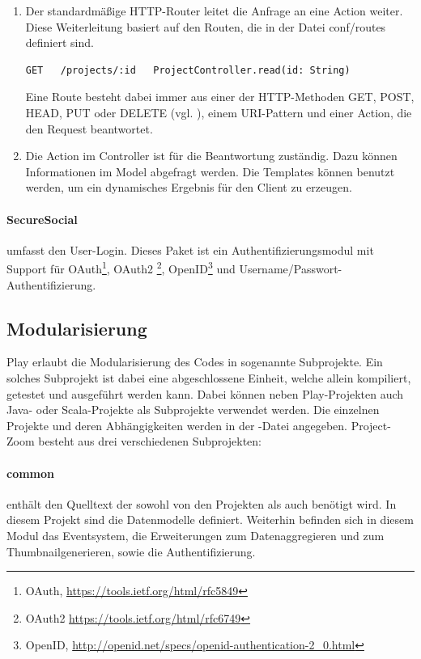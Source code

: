 \begin{enumerate}
  \item Der standardmäßige HTTP-Router leitet die Anfrage an eine Action weiter. Diese Weiterleitung basiert auf den Routen, die in der Datei conf/routes definiert sind.
\begin{lstlisting}
GET   /projects/:id   ProjectController.read(id: String)
\end{lstlisting}
Eine Route besteht dabei immer aus einer der HTTP-Methoden GET, POST, HEAD, PUT oder DELETE (vgl. \cite{play-scala-routing}), einem URI-Pattern und einer Action, die den Request beantwortet.
\item Die Action im Controller ist für die Beantwortung zuständig. Dazu können Informationen im Model abgefragt werden. Die Templates können benutzt werden, um ein dynamisches Ergebnis für den Client zu erzeugen.
\end{enumerate}

\paragraph{SecureSocial} umfasst den User-Login. Dieses Paket ist ein Authentifizierungsmodul mit Support für OAuth\footnote{OAuth, \url{https://tools.ietf.org/html/rfc5849}}, OAuth2 \footnote{OAuth2 \url{https://tools.ietf.org/html/rfc6749}}, OpenID\footnote{OpenID, \url{http://openid.net/specs/openid-authentication-2_0.html}} und Username/Passwort-Authentifizierung. 

\subsection{Modularisierung}
Play erlaubt die Modularisierung des Codes in sogenannte Subprojekte. Ein solches Subprojekt ist dabei eine abgeschlossene Einheit, welche allein kompiliert, getestet und ausgeführt werden kann. Dabei können neben Play-Projekten auch Java- oder Scala-Projekte als Subprojekte verwendet werden. Die einzelnen Projekte und deren Abhängigkeiten werden in der -Datei angegeben.
Project-Zoom besteht aus drei verschiedenen Subprojekten:

\paragraph{common} enthält den Quelltext der sowohl von den Projekten  als auch  benötigt wird. In diesem Projekt sind die Datenmodelle definiert. Weiterhin befinden sich in diesem Modul das Eventsystem, die Erweiterungen zum Datenaggregieren und zum Thumbnailgenerieren, sowie die Authentifizierung.

